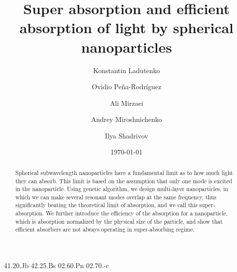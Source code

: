\documentclass[aps,prl,twocolumn,showpacs,superscriptaddress,groupedaddress]{revtex4-1}
\begin{document}

\title{Super absorption and efficient absorption of light by spherical
  nanoparticles}


\author{Konstantin Ladutenko} 


\author{Ovidio Pe\~{n}a-Rodr\'{i}guez} 


\author{Ali Mirzaei} \author{Andrey Miroshnichenko} \author{Ilya
  Shadrivov} 

\date{\today}

\begin{abstract}
  Spherical subwavelength nanoparticles have a fundamental limit as to
  how much light they can absorb. This limit is based on the
  assumption that only one mode is excited in the nanoparticle. Using
  genetic algorithm, we design multi-layer nanoparticles, in which we
  can make several resonant modes overlap at the same frequency, thus
  significantly beating the theoretical limit of absorption, and we
  call this super-absorption. We further introduce the efficiency of
  the absorption for a nanoparticle, which is absorption normalized by
  the physical size of the particle, and show that efficient absorbers
  are not always operating in super-absorbing regime.
\end{abstract}


\pacs%
{41.20.Jb 42.25.Bs 02.60.Pn 02.70.-c}
\end{document}
